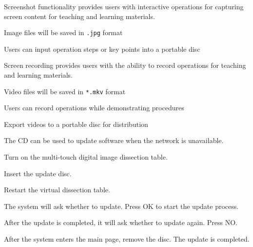 \documentclass[11pt,a4paper]{article}
\begin{document}


Screenshot functionality provides users with interactive operations for capturing
screen content for teaching and learning materials.

\begin{tbkList}
  \item Image files will be saved in \texttt{.jpg} format
  \item Users can input operation steps or key points into a portable disc
\end{tbkList}


Screen recording provides users with the ability to record operations for
teaching and learning materials.

\begin{tbkList}
  \item Video files will be saved in \texttt{*.mkv} format
  \item Users can record operations while demonstrating procedures
  \item Export videos to a portable disc for distribution
\end{tbkList}


The CD can be used to update software when the network is unavailable.

\begin{tbkSteps}
  \item Turn on the multi-touch digital image dissection table.
  \item Insert the update disc.
  \item Restart the virtual dissection table.
  \item The system will ask whether to update. Press OK to start the update process.
  \item After the update is completed, it will ask whether to update again. Press NO.
  \item After the system enters the main page, remove the disc. The update is completed.
\end{tbkSteps}

\end{document}
